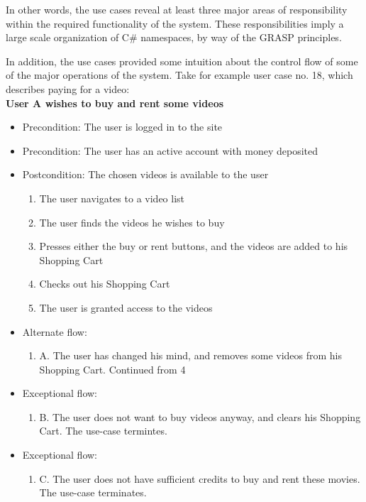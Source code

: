 In other words, the use cases reveal at least three major areas of responsibility within the required functionality of the system. These responsibilities imply a large scale organization of C\# namespaces, by way of the GRASP principles.

In addition, the use cases provided some intuition about the control flow of some of the major operations of the system. Take for example user case no. 18, which describes paying for a video:\\

\textbf{User A wishes to buy and rent some videos}
\begin{itemize}
\item Precondition: The user is logged in to the site
\item Precondition: The user has an active account with money deposited
\item Postcondition: The chosen videos is available to the user
\begin{enumerate}
	\item The user navigates to a video list
	\item The user finds the videos he wishes to buy
    \item Presses either the buy or rent buttons, and the videos are added to his Shopping Cart
    \item Checks out his Shopping Cart
    \item The user is granted access to the videos
\end{enumerate}
	
\item Alternate flow:
\begin{enumerate}
	 \item A. The user has changed his mind, and removes some videos from his Shopping Cart. Continued from 4
\end{enumerate}
   
\item Exceptional flow:
\begin{enumerate}
 \item B. The user does not want to buy videos anyway, and clears his Shopping Cart. The use-case termintes.
\end{enumerate}
   
\item Exceptional flow:
\begin{enumerate}
	\item C. The user does not have sufficient credits to buy and rent these movies. The use-case terminates.
\end{enumerate}
    
\end{itemize}

